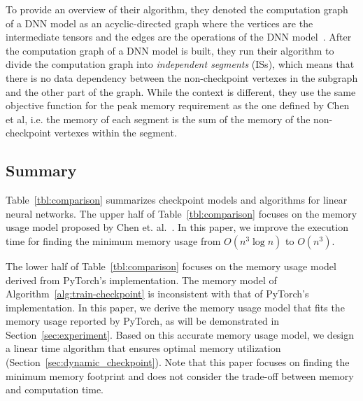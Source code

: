 To provide an overview of their algorithm, they denoted the computation graph of a DNN model as an acyclic-directed graph where the vertices are the intermediate tensors and the edges are the operations of the DNN model~\cite{feng2021optimal}. 
After the computation graph of a DNN model is built, they run their algorithm to divide the computation graph into {\em independent segments} (ISs), which means that there is no data dependency between the non-checkpoint vertexes in the subgraph and the other part of the graph. While the context is different, they use the same objective function for the peak memory requirement as the one defined by Chen et al, i.e. the memory of each segment is the sum of the memory of the non-checkpoint vertexes within the segment.

\subsection{Summary}

Table~\ref{tbl:comparison} summarizes checkpoint models and algorithms for linear neural networks.
%
The upper half of Table~\ref{tbl:comparison} focuses on the memory usage model proposed by Chen et. al.~\cite{chen2016training}.
In this paper, we improve the execution time for finding the minimum memory usage from $O(n^3 \log n)$ to $O(n^3)$.

The lower half of Table~\ref{tbl:comparison} focuses on the memory usage model derived from PyTorch's implementation.
The memory model of Algorithm~\ref{alg:train-checkpoint} is inconsistent with that of PyTorch's implementation.
In this paper, we derive the memory usage model that fits the memory usage reported by PyTorch, as will be demonstrated in Section~\ref{sec:experiment}.
Based on this accurate memory usage model, we design a linear time algorithm that ensures optimal memory utilization (Section~\ref{sec:dynamic_checkpoint}).
Note that this paper focuses on finding the minimum memory footprint and does not consider the trade-off between memory and computation time.

